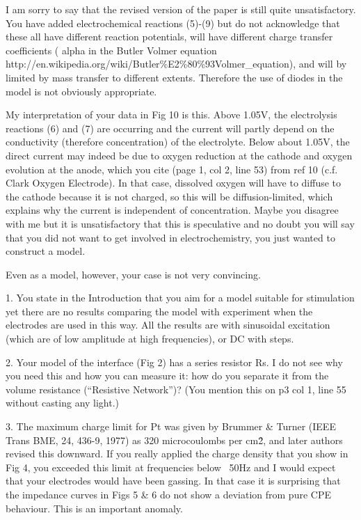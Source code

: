 \documentclass[journal, a4paper]{IEEEtran}
\begin{document}
{
    \color{OliveGreen}

    I am sorry to say that the revised version of the paper is still quite unsatisfactory. You have added electrochemical reactions (5)-(9) but do not acknowledge that these all have different reaction potentials, will have different charge transfer coefficients ( alpha in the Butler Volmer equation http://en.wikipedia.org/wiki/Butler\%E2\%80\%93Volmer\_equation), and will by limited by mass transfer to different extents. Therefore the use of diodes in the model is not obviously appropriate.

    My interpretation of your data in Fig 10 is this. Above 1.05V, the electrolysis reactions (6) and (7) are occurring and the current will partly depend on the conductivity (therefore concentration) of the electrolyte. Below about 1.05V, the direct current may indeed be due to oxygen reduction at the cathode and oxygen evolution at the anode, which you cite (page 1, col 2, line 53) from ref 10 (c.f. Clark Oxygen Electrode). In that case, dissolved oxygen will have to diffuse to the cathode because it is not charged, so this will be diffusion-limited, which explains why the current is independent of concentration. Maybe you disagree with me but it is unsatisfactory that this is speculative and no doubt you will say that you did not want to get involved in electrochemistry, you just wanted to construct a model.

    Even as a model, however, your case is not very convincing.

    1. You state in the Introduction that you aim for a model suitable for stimulation yet there are no results comparing the model with experiment when the electrodes are used in this way. All the results are with sinusoidal excitation (which are of low amplitude at high frequencies), or DC with steps.

    2. Your model of the interface (Fig 2) has a series resistor Rs. I do not see why you need this and how you can measure it: how do you separate it from the volume resistance (``Resistive Network'')? (You mention this on p3 col 1, line 55 without casting any light.)

    3. The maximum charge limit for Pt was given by Brummer \& Turner (IEEE Trans BME, 24, 436-9, 1977) as 320 microcoulombs per cm\^2, and later authors revised this downward. If you really applied the charge density that you show in Fig 4, you exceeded this limit at frequencies below ~50Hz and I would expect that your electrodes would have been gassing. In that case it is surprising that the impedance curves in Figs 5 \& 6 do not show a deviation from pure CPE behaviour. This is an important anomaly.

}
\end{document}

